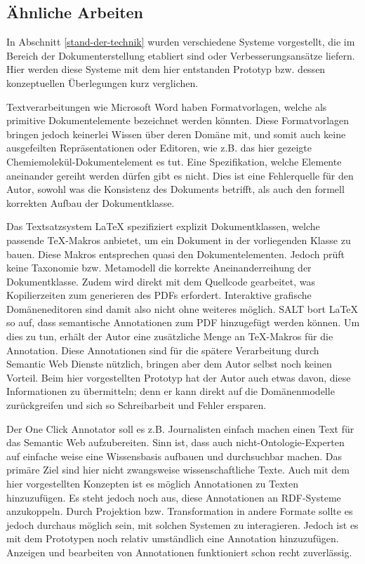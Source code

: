 \subsection{Ähnliche Arbeiten}\label{}
 
In Abschnitt \ref{stand-der-technik} wurden verschiedene Systeme vorgestellt, die im Bereich der Dokumenterstellung etabliert sind oder Verbesserungsansätze liefern. Hier werden diese Systeme mit dem hier entstanden Prototyp bzw. dessen konzeptuellen Überlegungen kurz verglichen.

 
Textverarbeitungen wie Microsoft Word haben Formatvorlagen, welche als primitive Dokumentelemente bezeichnet werden könnten. Diese Formatvorlagen bringen jedoch keinerlei Wissen über deren Domäne mit, und somit auch keine ausgefeilten Repräsentationen oder Editoren, wie z.B. das hier gezeigte Chemiemolekül-Dokumentelement es tut. Eine Spezifikation, welche Elemente aneinander gereiht werden dürfen gibt es nicht. Dies ist eine Fehlerquelle für den Autor, sowohl was die Konsistenz des Dokuments betrifft, als auch den formell korrekten Aufbau der Dokumentklasse.

 
Das Textsatzsystem LaTeX spezifiziert explizit Dokumentklassen, welche passende TeX-Makros anbietet, um ein Dokument in der vorliegenden Klasse zu bauen. Diese Makros entsprechen quasi den Dokumentelementen. Jedoch prüft keine Taxonomie bzw. Metamodell die korrekte Aneinanderreihung der Dokumentklasse. Zudem wird direkt mit dem Quellcode gearbeitet, was Kopilierzeiten zum generieren des PDFs erfordert. Interaktive grafische Domäneneditoren sind damit also nicht ohne weiteres möglich. SALT \citep{Groza} bort LaTeX so auf, dass semantische Annotationen zum PDF hinzugefügt werden können. Um dies zu tun, erhält der Autor eine zusätzliche Menge an TeX-Makros für die Annotation. Diese Annotationen sind für die spätere Verarbeitung durch Semantic Web Dienste nützlich, bringen aber dem Autor selbst noch keinen Vorteil. Beim hier vorgestellten Prototyp hat der Autor auch etwas davon, diese Informationen zu übermitteln; denn er kann direkt auf die Domänenmodelle zurückgreifen und sich so Schreibarbeit und Fehler ersparen.

 
Der One Click Annotator \citep{Heese} soll es z.B. Journalisten einfach machen einen Text für das Semantic Web aufzubereiten. Sinn ist, dass auch nicht-Ontologie-Experten auf einfache weise eine Wissensbasis aufbauen und durchsuchbar machen. Das primäre Ziel sind hier nicht zwangsweise wissenschaftliche Texte. Auch mit dem hier vorgestellten Konzepten ist es möglich Annotationen zu Texten hinzuzufügen. Es steht jedoch noch aus, diese Annotationen an RDF-Systeme anzukoppeln. Durch Projektion bzw. Transformation in andere Formate sollte es jedoch durchaus möglich sein, mit solchen Systemen zu interagieren. Jedoch ist es mit dem Prototypen noch relativ umständlich eine Annotation hinzuzufügen. Anzeigen und bearbeiten von Annotationen funktioniert schon recht zuverlässig.

